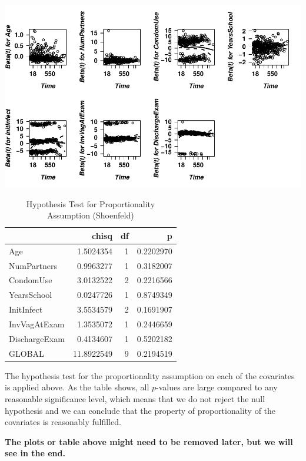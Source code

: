 \documentclass[
]{article}
\begin{document}
\includegraphics{practical_files/figure-latex/unnamed-chunk-4-1.pdf}

\begin{table}

\caption{\label{tab:schoenfeld-table}Hypothesis Test for Proportionality Assumption (Shoenfeld)}
\centering
\begin{tabular}[t]{l|r|r|r}
\hline
  & chisq & df & p\\
\hline
Age & 1.5024354 & 1 & 0.2202970\\
\hline
NumPartners & 0.9963277 & 1 & 0.3182007\\
\hline
CondomUse & 3.0132522 & 2 & 0.2216566\\
\hline
YearsSchool & 0.0247726 & 1 & 0.8749349\\
\hline
InitInfect & 3.5534579 & 2 & 0.1691907\\
\hline
InvVagAtExam & 1.3535072 & 1 & 0.2446659\\
\hline
DischargeExam & 0.4134607 & 1 & 0.5202182\\
\hline
GLOBAL & 11.8922549 & 9 & 0.2194519\\
\hline
\end{tabular}
\end{table}

The hypothesis test for the proportionality assumption on each of the covariates is applied above. As the table shows, all \(p\)-values are large compared to any reasonable significance level, which means that we do not reject the null hypothesis and we can conclude that the property of proportionality of the covariates is reasonably fulfilled.

\textbf{The plots or table above might need to be removed later, but we will see in the end.}
\end{document}
